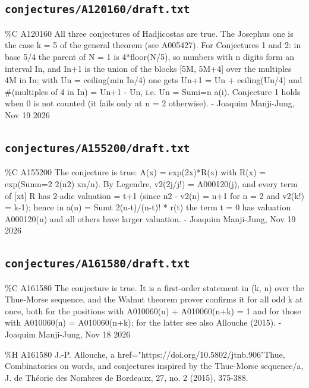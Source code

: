 \subsection*{\texttt{conjectures/A120160/draft.txt}}
{\small\raggedright\ttfamily
\%C A120160 All three conjectures of Hadjicostas are true. The Josephus one is the case k = 5 of the general theorem (see A005427). For Conjectures 1 and 2: in base 5/4 the parent of N = 1 is 4*floor(N/5), so numbers with n digits form an interval In, and In+1 is the union of the blocks [5M, 5M+4] over the multiples 4M in In; with Un = ceiling(min In/4) one gets Un+1 = Un + ceiling(Un/4) and \#(multiples of 4 in In) = Un+1 - Un, i.e. Un = Sumi=n a(i). Conjecture 1 holds when 0 is not counted (it fails only at n = 2 otherwise). - Joaquim Manji-Jung, Nov 19 2026\par
}
\subsection*{\texttt{conjectures/A155200/draft.txt}}
{\small\raggedright\ttfamily
\%C A155200 The conjecture is true: A(x) = exp(2x)*R(x) with R(x) = exp(Sumn=2 2(n2) xn/n). By Legendre, v2(2j/j!) = A000120(j), and every term of [xt] R has 2-adic valuation = t+1 (since n2 - v2(n) = n+1 for n = 2 and v2(k!) = k-1); hence in a(n) = Sumt 2(n-t)/(n-t)! * r(t) the term t = 0 has valuation A000120(n) and all others have larger valuation. - Joaquim Manji-Jung, Nov 19 2026\par
}
\subsection*{\texttt{conjectures/A161580/draft.txt}}
{\small\raggedright\ttfamily
\%C A161580 The conjecture is true. It is a first-order statement in (k, n) over the Thue-Morse sequence, and the Walnut theorem prover confirms it for all odd k at once, both for the positions with A010060(n) + A010060(n+k) = 1 and for those with A010060(n) = A010060(n+k); for the latter see also Allouche (2015). - Joaquim Manji-Jung, Nov 18 2026\par
\%H A161580 J.-P. Allouche, a href="https://doi.org/10.5802/jtnb.906"Thue, Combinatorics on words, and conjectures inspired by the Thue-Morse sequence/a, J. de Théorie des Nombres de Bordeaux, 27, no. 2 (2015), 375-388.\par
}
